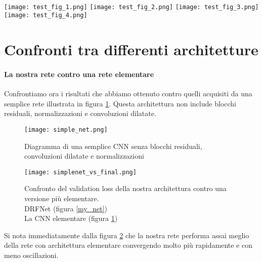 \noindent{}\\
\texttt{[image: test\_fig\_1.png]}
\texttt{[image: test\_fig\_2.png]}
\texttt{[image: test\_fig\_3.png]}
\texttt{[image: test\_fig\_4.png]}

\section{Confronti tra differenti architetture}
\paragraph{La nostra rete contro una rete elementare}Confrontiamo ora i risultati che abbiamo ottenuto contro quelli acquisiti da una semplice rete illustrata in figura \ref{simple_net}. Questa architettura non include blocchi residuali, normalizzazioni e convoluzioni dilatate.
\begin{figure}[ht]
    \centering
    \texttt{[image: simple\_net.png]}
    \caption{Diagramma di una semplice CNN senza blocchi residuali, convoluzioni dilatate e normalizzazioni}
    \label{simple_net}
\end{figure}

\begin{figure}[ht]
    \centering
    \texttt{[image: simplenet\_vs\_final.png]}
    \caption[Confronto del validation loss della nostra architettura contro una versione più elementare]{
        Confronto del validation loss della nostra architettura contro una versione più elementare. \\
        \quad DRFNet (figura \ref{my_net})\\
        \quad La CNN elementare (figura \ref{simple_net})
    }
    \label{simplevsfinal}
\end{figure}

Si nota immediatamente dalla figura \ref{simplevsfinal} che la nostra rete performa assai meglio della rete con architettura elementare convergendo molto più rapidamente e con meno oscillazioni.

